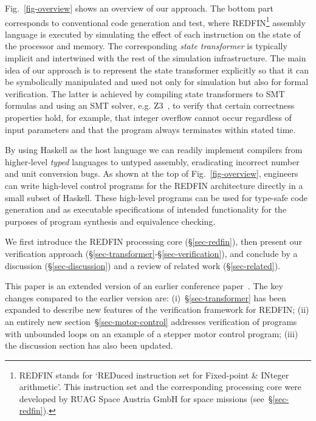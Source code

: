 Fig.~\ref{fig-overview} shows an overview of our approach. The bottom part
corresponds to conventional code generation and test, where
REDFIN\footnote{REDFIN stands for `REDuced instruction set for Fixed-point \&
INteger arithmetic'. This instruction set and the corresponding processing core
were developed by RUAG Space Austria GmbH for space missions
(see~\S\ref{sec-redfin}).} assembly language is executed by
simulating the effect of each instruction on the state of the processor and memory.
The corresponding \emph{state transformer} is typically implicit and intertwined
with the rest of the simulation infrastructure. The main idea of our approach is
to represent the state transformer explicitly so that it can be symbolically
manipulated and used not only for simulation but also for formal verification.
The latter is achieved by compiling state transformers to SMT formulas and using
an SMT solver, e.g. Z3~\cite{de2008z3}, to verify that certain correctness
properties hold, for example, that integer overflow cannot occur regardless of
input parameters and that the program always terminates within stated time.

By using Haskell as the host language we can readily implement compilers from
higher-level \emph{typed} languages to untyped assembly, eradicating incorrect
number and unit conversion bugs. As shown at the top of Fig.~\ref{fig-overview},
engineers can write high-level control programs for the REDFIN architecture
directly in a small subset of Haskell. These high-level programs can be used for
type-safe code generation and as executable specifications of intended
functionality for the purposes of program synthesis and equivalence checking.


We first introduce the REDFIN processing core (\S\ref{sec-redfin}), then
present our verification approach (\S\ref{sec-transformer}-\S\ref{sec-verification}),
and conclude by a discussion (\S\ref{sec-discussion}) and a review of related
work (\S\ref{sec-related}).

This paper is an extended version of an earlier conference
paper~\cite{redfin-hs-19}. The key changes compared to the earlier
version are: (i)~\S\ref{sec-transformer} has been expanded to describe new
features of the verification framework for REDFIN;
(ii) an entirely new section~\S\ref{sec-motor-control} addresses verification
of programs with unbounded loops on an
example of a stepper motor control program; (iii) the discussion
section has also been updated.
